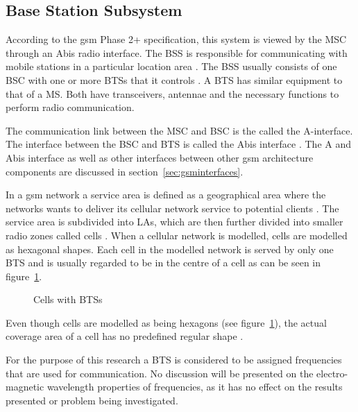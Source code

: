 \subsection{Base Station Subsystem}

According to the \gls{gsm} Phase 2+ specification, this system is viewed by the \gls{MSC} through an Abis radio interface. The \gls{BSS} is responsible for communicating with mobile stations in a particular location area \cite{Eisenblatter}. The \gls{BSS} usually consists of one \gls{BSC} with one or more \glspl{BTS} that it controls \cite{Eisenblatter}. A \gls{BTS} has similar equipment to that of a MS\cite{GSMSysEngin}. Both have transceivers, antennae and the necessary functions to perform radio communication.

The communication link between the \gls{MSC} and \gls{BSC} is the called the A-interface. The interface between the \gls{BSC} and \gls{BTS} is called the Abis interface \cite{Eisenblatter}. The A and Abis interface as well as other interfaces between other \gls{gsm} architecture components are discussed in section~\ref{sec:gsminterfaces}.  

In a \gls{gsm} network a service area is defined as a geographical area where the networks wants to deliver its cellular network service to potential clients \cite{GSMArchitectureProtocolsServices, Karen2004}. The service area is subdivided into \glspl{LA}, which are then further divided into smaller radio zones called cells \cite{GSMSecurInTeleNetwork}. When a cellular network is modelled, cells are modelled as hexagonal shapes. Each cell in the modelled network is served by only one \gls{BTS} and is usually regarded to be in the centre of a cell as can be seen in figure~\ref{fig:GSMCell}\cite{GSMArchitectureProtocolsServices}. 
\begin{figure}[H]
	\begin{centering}
		
		\caption{Cells with BTSs}
		\label{fig:GSMCell}
	\end{centering}
\end{figure}
Even though cells are modelled as being hexagons (see figure~\ref{fig:GSMCell}), the actual coverage area of a cell has no predefined regular shape \cite{GSMArchitectureProtocolsServices}.

For the purpose of this research a \gls{BTS} is considered to be assigned frequencies that are used for communication. No discussion will be presented on the electro-magnetic wavelength properties of frequencies, as it has no effect on the results presented or problem being investigated.


